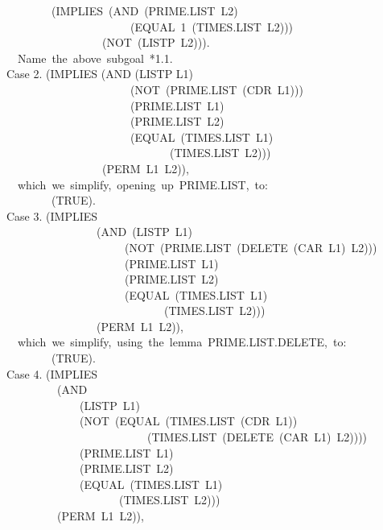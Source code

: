 \documentclass[10pt]{book}
\newenvironment{pubasis}{\begin{flushleft}}{\end{flushleft}}
\begin{document}
\begin{pubasis}
~~~~~~~~(IMPLIES~(AND~(PRIME.LIST~L2)\\
~~~~~~~~~~~~~~~~~~~~~~(EQUAL~1~(TIMES.LIST~L2)))\\
~~~~~~~~~~~~~~~~~(NOT~(LISTP~L2))).\\

~~Name~the~above~subgoal~*1.1.\\

Case 2.	(IMPLIES (AND (LISTP L1)\\
~~~~~~~~~~~~~~~~~~~~~~(NOT~(PRIME.LIST~(CDR~L1)))\\
~~~~~~~~~~~~~~~~~~~~~~(PRIME.LIST~L1)\\
~~~~~~~~~~~~~~~~~~~~~~(PRIME.LIST~L2)\\
~~~~~~~~~~~~~~~~~~~~~~(EQUAL~(TIMES.LIST~L1)\\
~~~~~~~~~~~~~~~~~~~~~~~~~~~~~(TIMES.LIST~L2)))\\
~~~~~~~~~~~~~~~~~(PERM~L1~L2)),\\

~~which~we~simplify,~opening~up~PRIME.LIST,~to:\\

~~~~~~~~(TRUE).\\

Case 3.	(IMPLIES\\
~~~~~~~~~~~~~~~~(AND~(LISTP~L1)\\
~~~~~~~~~~~~~~~~~~~~~(NOT~(PRIME.LIST~(DELETE~(CAR~L1)~L2)))\\
~~~~~~~~~~~~~~~~~~~~~(PRIME.LIST~L1)\\
~~~~~~~~~~~~~~~~~~~~~(PRIME.LIST~L2)\\
~~~~~~~~~~~~~~~~~~~~~(EQUAL~(TIMES.LIST~L1)\\
~~~~~~~~~~~~~~~~~~~~~~~~~~~~(TIMES.LIST~L2)))\\
~~~~~~~~~~~~~~~~(PERM~L1~L2)),\\

~~which~we~simplify,~using~the~lemma~PRIME.LIST.DELETE,~to:\\

~~~~~~~~(TRUE).\\

Case 4.	(IMPLIES\\
~~~~~~~~~(AND\\
~~~~~~~~~~~~~(LISTP~L1)\\
~~~~~~~~~~~~~(NOT~(EQUAL~(TIMES.LIST~(CDR~L1))\\
~~~~~~~~~~~~~~~~~~~~~~~~~(TIMES.LIST~(DELETE~(CAR~L1)~L2))))\\
~~~~~~~~~~~~~(PRIME.LIST~L1)\\
~~~~~~~~~~~~~(PRIME.LIST~L2)\\
~~~~~~~~~~~~~(EQUAL~(TIMES.LIST~L1)\\
~~~~~~~~~~~~~~~~~~~~(TIMES.LIST~L2)))\\
~~~~~~~~~(PERM~L1~L2)),\\


\end{pubasis}
\end{document}

